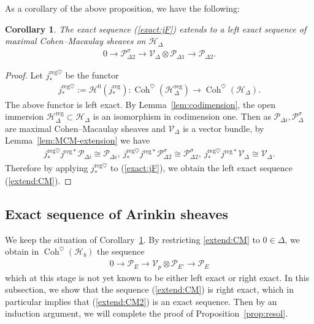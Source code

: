 \documentclass[11pt,oneside,a4paper,mathscr]{amsart}
\newtheorem{cor}[thm]{Corollary}
\theoremstyle{definition}
\newcommand{\cH}{\mathcal{H}}
\newcommand{\cP}{\mathcal{P}}
\newcommand{\Coh}{\operatorname{Coh}}
\begin{document}
As a corollary of the above proposition, we have the following: 
\begin{cor}\label{cor:CM}
    The exact sequence (\ref{exact:jF}) extends to a left exact sequence of maximal Cohen--Macaulay 
    sheaves on $\cH_{\Delta}$
    \begin{align}\label{extend:CM}
        0\to \cP_{\Delta 2}^{\sigma}\to \mathcal{V}_{\Delta}\otimes \cP_{\Delta 1}
        \to \cP_{\Delta 2}.
    \end{align}
\end{cor}
\begin{proof}
    Let $j_{*}^{\mathrm{reg}\heartsuit}$ be the functor 
    \begin{align*}
    j_{*}^{\mathrm{reg}\heartsuit}:=\cH^0(j_{*}^{\mathrm{reg}}) \colon 
    \Coh^{\heartsuit}(\cH_{\Delta}^{\mathrm{reg}}) \to 
     \Coh^{\heartsuit}(\cH_{\Delta}).
    \end{align*}
    The above functor is left exact. 
    By Lemma~\ref{lem:codimension}, the open immersion $\cH_{\Delta}^{\mathrm{reg}} \subset 
    \cH_{\Delta}$ is an isomorphism in codimension one. Then as $\cP_{\Delta i}, \cP_{\Delta}^{\sigma}$ are 
    maximal Cohen--Macaulay sheaves and $\mathcal{V}_{\Delta}$ is a vector bundle, by Lemma~\ref{lem:MCM-extension} we have 
    \begin{align*}j_{*}^{\mathrm{reg}\heartsuit}j^{\mathrm{reg}*} \cP_{\Delta i} \cong \cP_{\Delta i}, \ j_{*}^{\mathrm{reg}\heartsuit}j^{\mathrm{reg}*} \cP_{\Delta 2}^{\sigma} \cong \cP_{\Delta 2}^{\sigma}, \ 
    j_{*}^{\mathrm{reg}\heartsuit}j^{\mathrm{reg}*} \mathcal{V}_{\Delta} \cong \mathcal{V}_{\Delta}.
    \end{align*}
    Therefore by applying $j_{*}^{\mathrm{reg}\heartsuit}$ to (\ref{exact:jF}), 
    we obtain the left exact sequence (\ref{extend:CM}). 
\end{proof}

\subsection{Exact sequence of Arinkin sheaves}\label{subsec:exAr}
We keep the situation of Corollary~\ref{cor:CM}.
By restricting \eqref{extend:CM} to $0\in \Delta$, we obtain in
$\Coh^{\heartsuit}(\cH_b)$ the sequence
\begin{align}\label{extend:CM2}
0\to \cP_E \to \mathcal{V}_p \otimes \cP_{E'} \to \cP_E
\end{align}
which at this stage is not yet known to be either left exact or right exact. 
In this subsection, we show that the sequence (\ref{extend:CM}) is right exact, which in particular implies that (\ref{extend:CM2}) is an 
exact sequence. 
Then by an induction argument, we will complete the proof of Proposition~\ref{prop:resol}.
\end{document}
